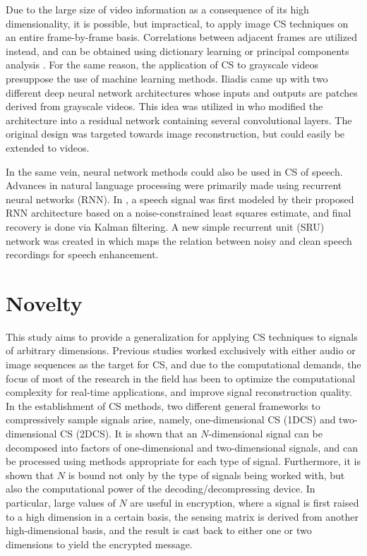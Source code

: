 Due to the large size of video information as a consequence of its high dimensionality, it is possible, but impractical, to apply image CS techniques on an entire frame-by-frame basis. Correlations between adjacent frames are utilized instead, and can be obtained using dictionary learning \cite{Liu2013} or principal components analysis \cite{Liu2014}. For the same reason, the application of CS to grayscale videos presuppose the use of machine learning methods. Iliadis \cite{Iliadis2018,Iliadis2020} came up with two different deep neural network architectures whose inputs and outputs are patches derived from grayscale videos. This idea was utilized in \cite{Yao2019} who modified the architecture into a residual network containing several convolutional layers. The original design was targeted towards image reconstruction, but could easily be extended to videos.

In the same vein, neural network methods could also be used in CS of speech. Advances in natural language processing were primarily made using recurrent neural networks (RNN). In \cite{Xia2015}, a speech signal was first modeled by their proposed RNN architecture based on a noise-constrained least squares estimate, and final recovery is done via Kalman filtering. A new simple recurrent unit (SRU) network was created in \cite{Cui2020} which maps the relation between noisy and clean speech recordings for speech enhancement.


\section{Novelty}
\label{sec:novel}
This study aims to provide a generalization for applying CS techniques to signals of arbitrary dimensions. Previous studies worked exclusively with either audio or image sequences as the target for CS, and due to the computational demands, the focus of most of the research in the field has been to optimize the computational complexity for real-time applications, and improve signal reconstruction quality. In the establishment of CS methods, two different general frameworks to compressively sample signals arise, namely, one-dimensional CS (1DCS) and two-dimensional CS (2DCS). It is shown that an $N$-dimensional signal can be decomposed into factors of one-dimensional and two-dimensional signals, and can be processed using methods appropriate for each type of signal. Furthermore, it is shown that $N$ is bound not only by the type of signals being worked with, but also the computational power of the decoding/decompressing device. In particular, large values of $N$ are useful in encryption, where a signal is first raised to a high dimension in a certain basis, the sensing matrix is derived from another high-dimensional basis, and the result is cast back to either one or two dimensions to yield the encrypted message.


